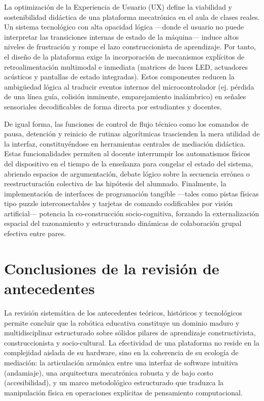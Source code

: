 \documentclass{prgrado}
\begin{document}
La optimización de la Experiencia de Usuario (UX) define la viabilidad y sostenibilidad didáctica de una plataforma mecatrónica en el aula de clases reales. Un sistema tecnológico con alta opacidad lógica —donde el usuario no puede interpretar las transiciones internas de estado de la máquina— induce altos niveles de frustración y rompe el lazo construccionista de aprendizaje. Por tanto, el diseño de la plataforma exige la incorporación de mecanismos explícitos de retroalimentación multimodal e inmediata (matrices de luces LED, actuadores acústicos y pantallas de estado integradas). Estos componentes reducen la ambigüedad lógica al traducir eventos internos del microcontrolador (ej. pérdida de una línea guía, colisión inminente, emparejamiento inalámbrico) en señales sensoriales decodificables de forma directa por estudiantes y docentes.

De igual forma, las funciones de control de flujo técnico como los comandos de pausa, detención y reinicio de rutinas algorítmicas trascienden la mera utilidad de la interfaz, constituyéndose en herramientas centrales de mediación didáctica. Estas funcionalidades permiten al docente interrumpir los automatismos físicos del dispositivo en el tiempo de la enseñanza para congelar el estado del sistema, abriendo espacios de argumentación, debate lógico sobre la secuencia errónea o reestructuración colectiva de las hipótesis del alumnado. Finalmente, la implementación de interfaces de programación tangible —tales como pistas físicas tipo puzzle interconectables y tarjetas de comando codificables por visión artificial— potencia la co-construcción socio-cognitiva, forzando la externalización espacial del razonamiento y estructurando dinámicas de colaboración grupal efectiva entre pares.

\section{Conclusiones de la revisión de antecedentes}

La revisión sistemática de los antecedentes teóricos, históricos y tecnológicos permite concluir que la robótica educativa constituye un dominio maduro y multidisciplinar estructurado sobre sólidos pilares de aprendizaje constructivista, construccionista y socio-cultural. La efectividad de una plataforma no reside en la complejidad aislada de su hardware, sino en la coherencia de su ecología de mediación: la articulación armónica entre una interfaz de software intuitiva (andamiaje), una arquitectura mecatrónica robusta y de bajo costo (accesibilidad), y un marco metodológico estructurado que traduzca la manipulación física en operaciones explícitas de pensamiento computacional.
\end{document}

